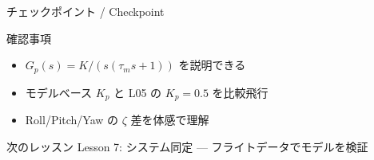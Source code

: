 \begin{frame}{チェックポイント / Checkpoint}
  \begin{alertblock}{確認事項}
    \begin{itemize}
      \item[$\square$] $G_p(s) = K / (s(\tau_m s + 1))$ を説明できる
      \item[$\square$] モデルベース $K_p$ と L05 の $K_p=0.5$ を比較飛行
      \item[$\square$] Roll/Pitch/Yaw の $\zeta$ 差を体感で理解
    \end{itemize}
  \end{alertblock}

  \vspace{1em}

  \begin{block}{次のレッスン}
    Lesson 7: システム同定 --- フライトデータでモデルを検証
  \end{block}
\end{frame}
